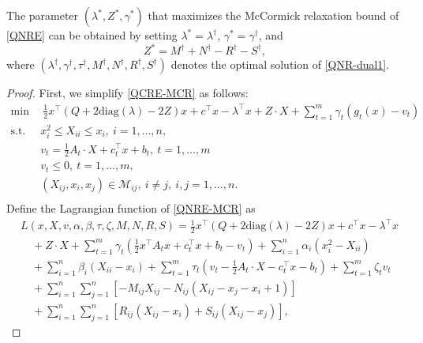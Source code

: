 \documentclass[10pt,a4paper]{amsart}
\begin{document}
\begin{theorem}\label{thm1}
	The parameter $(\lambda^\ast,Z^\ast,\gamma^\ast)$ that maximizes the McCormick relaxation bound of \eqref{QNRE} can be obtained by setting $\lambda^\ast=\lambda^\dag$, $\gamma^\ast=\gamma^\dag$, and
	\begin{equation}
		Z^\ast= M^\dag +  N^\dag -  R^\dag -  S^\dag,
	\end{equation}
	where $(\lambda^\dag,\gamma^\dag,\tau^\dag,M^\dag,N^\dag,R^\dag,S^\dag)$ denotes the optimal solution of \eqref{QNR-dual1}.
\end{theorem}

\begin{proof}
	First, we simplify \eqref{QCRE-MCR} as follows:
	\begin{equation}\label{QNRE-MCR}
		\begin{aligned}
			\min ~&~\frac{1}{2}x^\top(Q+2\textrm{diag}(\lambda)-2Z)x+c^\top x-\lambda^\top x+ Z\cdot X+\sum_{t=1}^m \gamma_t \left(g_t(x)-v_t\right)\\
			\textrm{s.t.}~ &x_i^2\leq X_{ii} \leq x_i,~i=1,\ldots,n,\\
			& v_t= \frac{1}{2}A_t \cdot X+ c_t^\top x+b_t,~t=1,\ldots,m\\
			&v_t\leq 0,~t=1,\ldots,m,\\
			&(X_{ij},x_i,x_j)\in \mathcal{M}_{ij}, ~i\neq j, ~i,j=1,\ldots,n.\\
		\end{aligned}
	\end{equation}	
	Define the Lagrangian function of \eqref{QNRE-MCR} as
	\begin{equation}
		\begin{aligned}
			&L(x,X,v,\alpha,\beta,\tau,\zeta,M,N,R,S)=\frac{1}{2}x^\top(Q+2\textrm{diag}(\lambda)-2Z)x+c^\top x-\lambda^\top x \\
			&\quad + Z\cdot X+\sum_{t=1}^m \gamma_t \left(\frac{1}{2} x^\top A_t x+c_t^\top x+b_t-v_t\right)+\sum_{i=1}^n\alpha_i(x_i^2-X_{ii})\\
			&\quad +\sum_{i=1}^n\beta_i(X_{ii}-x_i)+\sum_{t=1}^m \tau_t\left(  v_t-\frac{1}{2}A_t \cdot X- c_t^\top x-b_t \right)
			+\sum_{t=1}^m \zeta_t v_t\\
			&\quad +\sum_{i=1}^n\sum_{j=1}^n\left[ -M_{ij}X_{ij}-N_{ij}\left(X_{ij}-x_j-x_i+1\right)  \right]\\
			&\quad +\sum_{i=1}^n\sum_{j=1}^n\left[  R_{ij}(X_{ij}-x_i)+S_{ij}(X_{ij}-x_j) \right],
		\end{aligned}
	\end{equation}

\end{proof}
\end{document}
